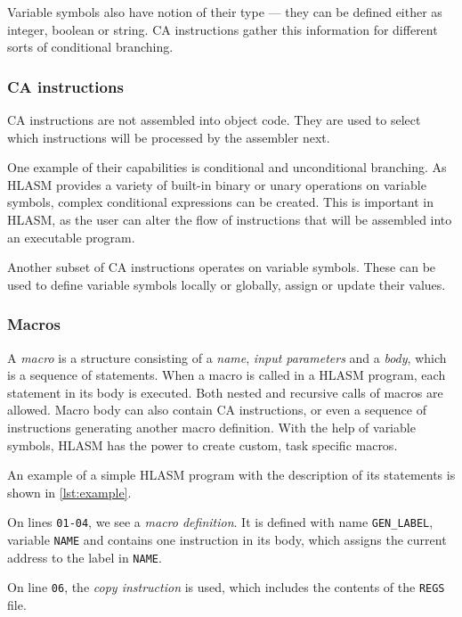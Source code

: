 Variable symbols also have notion of their type --- they can be defined either as integer, boolean or string. CA instructions gather this information for different sorts of conditional branching.

\subsubsection{CA instructions}
\label{ca_instr}

CA instructions are not assembled into object code. They are used to select which instructions will be processed by the assembler next.

One example of their capabilities is conditional and unconditional branching. As HLASM provides a variety of built-in binary or unary operations on variable symbols, complex conditional expressions can be created. This is important in HLASM, as the user can alter the flow of instructions that will be assembled into an executable program.

Another subset of CA instructions operates on variable symbols. These can be used to define variable symbols locally or globally, assign or update their values.

\subsubsection{Macros}

A \emph{macro} is a structure consisting of a \emph{name}, \emph{input parameters} and a \emph{body}, which is a sequence of statements. When a macro is called in a HLASM program, each statement in its body is executed. Both nested and recursive calls of macros are allowed. Macro body can also contain CA instructions, or even a sequence of instructions generating another macro definition. With the help of variable symbols, HLASM has the power to create custom, task specific macros.

\vspace{5mm}

An example of a simple HLASM program with the description of its statements is shown in \cref{lst:example}.

On lines \verb|01-04|, we see a \emph{macro definition}. It is defined with name \verb|GEN_LABEL|, variable \verb|NAME| and contains one instruction in its body, which assigns the current address to the label in \verb|NAME|.

On line \verb|06|, the \emph{copy instruction} is used, which includes the contents of the \verb|REGS| file.

